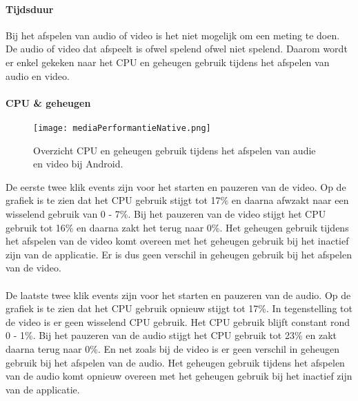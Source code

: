 \paragraph{Tijdsduur}
Bij het afspelen van audio of video is het niet mogelijk om een meting te doen. 
De audio of video dat afspeelt is ofwel spelend ofwel niet spelend.
Daarom wordt er enkel gekeken naar het CPU en geheugen gebruik tijdens 
het afspelen van audio en video.

\paragraph{CPU \& geheugen}
\begin{figure}[H]
    \centering
    \texttt{[image: mediaPerformantieNative.png]}
    \caption{Overzicht CPU en geheugen gebruik tijdens het afspelen van audie en video bij Android.}
\end{figure}
De eerste twee klik events zijn voor het starten en pauzeren van de video. Op de grafiek 
is te zien dat het CPU gebruik stijgt tot 17\% en daarna afwzakt naar een wisselend gebruik 
van 0 - 7\%. Bij het pauzeren van de video stijgt het CPU gebruik tot 16\% en daarna
zakt het terug naar 0\%. Het geheugen gebruik tijdens het afspelen van de video komt overeen 
met het geheugen gebruik bij het inactief zijn van de applicatie. Er is dus geen verschil in
geheugen gebruik bij het afspelen van de video.
\\\\
De laatste twee klik events zijn voor het starten en pauzeren van de audio. Op de grafiek
is te zien dat het CPU gebruik opnieuw stijgt tot 17\%. In tegenstelling tot de video is 
er geen wisselend CPU gebruik. Het CPU gebruik blijft constant rond 0 - 1\%. Bij het pauzeren
van de audio stijgt het CPU gebruik tot 23\% en zakt daarna terug naar 0\%. En net zoals bij de 
video is er geen verschil in geheugen gebruik bij het afspelen van de audio. Het geheugen gebruik
tijdens het afspelen van de audio komt opnieuw overeen met het geheugen gebruik bij het inactief zijn van
de applicatie.